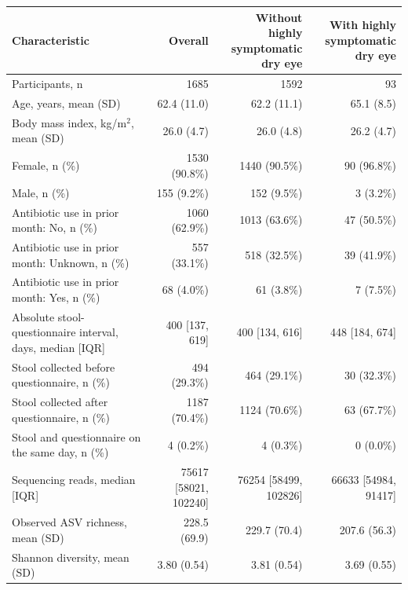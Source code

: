 \begin{tabular}{lrrr}
\toprule
Characteristic & Overall & \shortstack{Without highly\\symptomatic dry eye} & \shortstack{With highly\\symptomatic dry eye} \\
\midrule
Participants, n & 1685 & 1592 & 93 \\
Age, years, mean (SD) & 62.4 (11.0) & 62.2 (11.1) & 65.1 (8.5) \\
Body mass index, kg/m$^2$, mean (SD) & 26.0 (4.7) & 26.0 (4.8) & 26.2 (4.7) \\
Female, n (\%) & 1530 (90.8\%) & 1440 (90.5\%) & 90 (96.8\%) \\
Male, n (\%) & 155 (9.2\%) & 152 (9.5\%) & 3 (3.2\%) \\
Antibiotic use in prior month: No, n (\%) & 1060 (62.9\%) & 1013 (63.6\%) & 47 (50.5\%) \\
Antibiotic use in prior month: Unknown, n (\%) & 557 (33.1\%) & 518 (32.5\%) & 39 (41.9\%) \\
Antibiotic use in prior month: Yes, n (\%) & 68 (4.0\%) & 61 (3.8\%) & 7 (7.5\%) \\
Absolute stool-questionnaire interval, days, median [IQR] & 400 [137, 619] & 400 [134, 616] & 448 [184, 674] \\
Stool collected before questionnaire, n (\%) & 494 (29.3\%) & 464 (29.1\%) & 30 (32.3\%) \\
Stool collected after questionnaire, n (\%) & 1187 (70.4\%) & 1124 (70.6\%) & 63 (67.7\%) \\
Stool and questionnaire on the same day, n (\%) & 4 (0.2\%) & 4 (0.3\%) & 0 (0.0\%) \\
Sequencing reads, median [IQR] & 75617 [58021, 102240] & 76254 [58499, 102826] & 66633 [54984, 91417] \\
Observed ASV richness, mean (SD) & 228.5 (69.9) & 229.7 (70.4) & 207.6 (56.3) \\
Shannon diversity, mean (SD) & 3.80 (0.54) & 3.81 (0.54) & 3.69 (0.55) \\
\bottomrule
\end{tabular}
